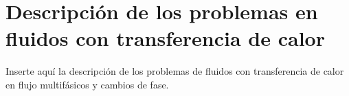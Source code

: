 \chapter{Descripción de los problemas en fluidos con transferencia de calor }
\graphicspath{{figs/cap2/}}
\label{cap2}

Inserte aquí la descripción de los problemas de fluidos con transferencia de calor en flujo multifásicos y cambios de fase.


